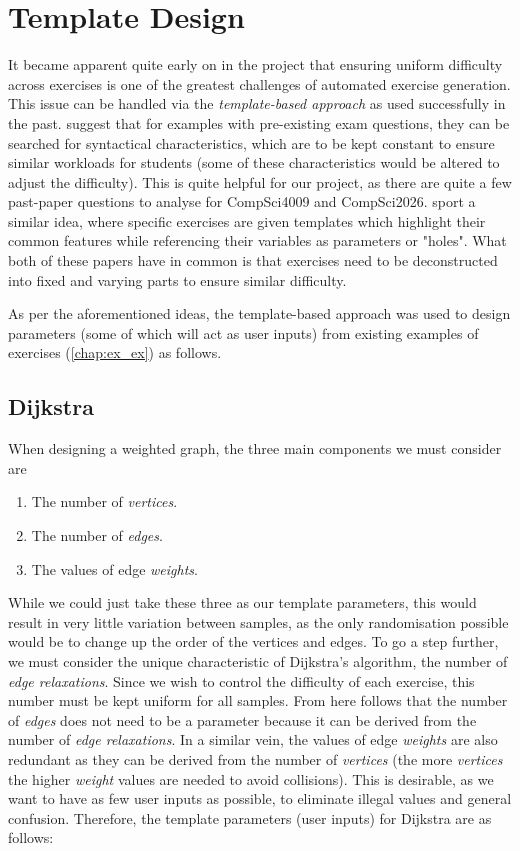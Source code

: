 \documentclass{l4proj}
\begin{document}
\section{Template Design}
\label{sec:td}

It became apparent quite early on in the project that ensuring uniform difficulty across exercises is one of the greatest challenges of automated exercise generation. This issue can be handled via the \emph{template-based approach} as used successfully in the past. \citet{Hoz21} suggest that for examples with pre-existing exam questions, they can be searched for syntactical characteristics, which are to be kept constant to ensure similar workloads for students (some of these characteristics would be altered to adjust the difficulty). This is quite helpful for our project, as there are quite a few past-paper questions to analyse for CompSci4009 and CompSci2026. \citet{Sad12} sport a similar idea, where specific exercises are given templates which highlight their common features while referencing their variables as parameters or "holes". What both of these papers have in common is that exercises need to be deconstructed into fixed and varying parts to ensure similar difficulty.

As per the aforementioned ideas, the template-based approach was used to design parameters (some of which will act as user inputs) from existing examples of exercises (\autoref{chap:ex_ex}) as follows.

\subsection{Dijkstra}
\label{sec:tdd}

When designing a weighted graph, the three main components we must consider are

\begin{enumerate}
	\item
 	The number of \emph{vertices}.
	\item
	The number of \emph{edges}.
	\item
	The values of edge \emph{weights}.
\end{enumerate}

While we could just take these three as our template parameters, this would result in very little variation between samples, as the only randomisation possible would be to change up the order of the vertices and edges. To go a step further, we must consider the unique characteristic of Dijkstra's algorithm, the number of \emph{edge relaxations}. Since we wish to control the difficulty of each exercise, this number must be kept uniform for all samples. From here follows that the number of \emph{edges} does not need to be a parameter because it can be derived from the number of \emph{edge relaxations}. In a similar vein, the values of edge \emph{weights} are also redundant as they can be derived from the number of \emph{vertices} (the more \emph{vertices} the higher \emph{weight} values are needed to avoid collisions). This is desirable, as we want to have as few user inputs as possible, to eliminate illegal values and general confusion. Therefore, the template parameters (user inputs) for Dijkstra are as follows:
\end{document}
